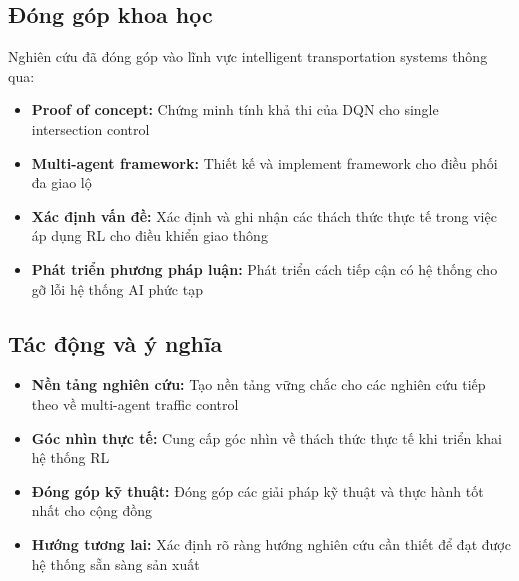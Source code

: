 \subsection{Đóng góp khoa học}
Nghiên cứu đã đóng góp vào lĩnh vực intelligent transportation systems thông qua:
\begin{itemize}
    \item \textbf{Proof of concept:} Chứng minh tính khả thi của DQN cho single
        intersection control

    \item \textbf{Multi-agent framework:} Thiết kế và implement framework cho điều phối đa giao lộ

    \item \textbf{Xác định vấn đề:} Xác định và ghi nhận các thách thức
        thực tế trong việc áp dụng RL cho điều khiển giao thông

    \item \textbf{Phát triển phương pháp luận:} Phát triển cách tiếp cận có hệ thống cho
        gỡ lỗi hệ thống AI phức tạp
\end{itemize}

\subsection{Tác động và ý nghĩa}
\begin{itemize}
    \item \textbf{Nền tảng nghiên cứu:} Tạo nền tảng vững chắc cho các nghiên
        cứu tiếp theo về multi-agent traffic control

    \item \textbf{Góc nhìn thực tế:} Cung cấp góc nhìn về
        thách thức thực tế khi triển khai hệ thống RL

    \item \textbf{Đóng góp kỹ thuật:} Đóng góp các giải pháp kỹ thuật và thực hành tốt nhất
        cho cộng đồng

    \item \textbf{Hướng tương lai:} Xác định rõ ràng hướng nghiên cứu cần
        thiết để đạt được hệ thống sẵn sàng sản xuất
\end{itemize}

